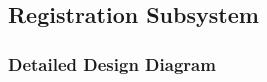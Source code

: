 \documentclass[12pt]{article}
\begin{document}


\newpage

\subsection{Registration Subsystem}

\subsubsection{Detailed Design Diagram}
\end{document}
